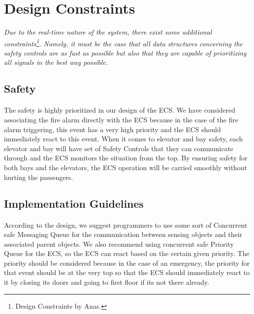 \documentclass[12pt]{article}
\begin{document}
\section{Design Constraints} \label{cons}
\paragraph{} \textit{Due to the real-time nature of the system, there exist some additional constraints\footnote{Design Constraints by Anas.}. Namely, it must be
the case that all data structures concerning the safety controls are as fast as possible but also that they are capable of 
prioritizing all signals in the best way possible.}

	\subsection{Safety}
		\paragraph{} The safety is highly prioritized in our design of the ECS. We have 
		considered associating the fire alarm directly with the ECS because in the case 
		of the fire alarm triggering, this event has a very high priority and the ECS 
		should immediately react to this event. When it comes to elevator and bay safety, 
		each elevator and bay will have set of Safety Controls that they can communicate 
		through and the ECS monitors the situation from the top. By ensuring safety for 
		both bays and the elevators, the ECS operation will be carried smoothly without 
		hurting the passengers.

	\subsection{Implementation Guidelines}
		\paragraph{} According to the design, we suggest programmers to use some sort of 
		Concurrent safe Messaging Queue for the communication between sensing objects and 
		their associated parent objects. We also recommend using concurrent safe Priority 
		Queue for the ECS, so the ECS can react based on the certain given priority. The 
		priority should be considered because in the case of an emergency, the priority 
		for that event should be at the very top so that the ECS should immediately react 
		to it by closing its doors and going to first floor if its not there already.
\end{document}
